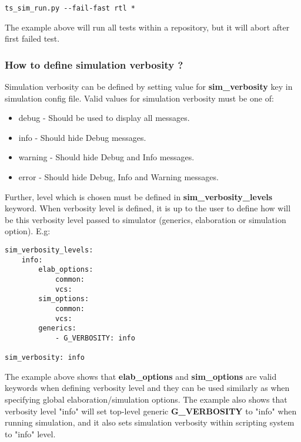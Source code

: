 \documentclass{tropic_design_spec}
\begin{document}
\begin{lstlisting}
ts_sim_run.py --fail-fast rtl *
\end{lstlisting}

The example above will run all tests within a repository, but it will abort after first
failed test.


\subsubsection{How to define simulation verbosity ?}
\label{sec:how-to-define-simulation-verbosity}

Simulation verbosity can be defined by setting value for \textbf{sim_verbosity} key in
simulation config file. Valid values for simulation verbosity must be one of:

\begin{itemize}
    \item{debug - Should be used to display all messages.}
    \item{info - Should hide Debug messages.}
    \item{warning - Should hide Debug and Info messages.}
    \item{error - Should hide Debug, Info and Warning messages.}
\end{itemize}

Further, level which is chosen must be defined in \textbf{sim_verbosity_levels} keyword.
When verbosity level is defined, it is up to the user to define how will be this verbosity
level passed to simulator (generics, elaboration or simulation option). E.g:

\begin{lstlisting}
sim_verbosity_levels:
    info:
        elab_options:
            common:
            vcs:
        sim_options:
            common:
            vcs:
        generics:
            - G_VERBOSITY: info

sim_verbosity: info
\end{lstlisting}

The example above shows that \textbf{elab_options} and \textbf{sim_options} are valid
keywords when defining verbosity level and they can be used similarly as
when specifying global elaboration/simulation options.
The example also shows that verbosity level "info" will set top-level generic
\textbf{G_VERBOSITY} to "info" when running simulation, and it also sets simulation
verbosity within scripting system to "info" level.
\end{document}
